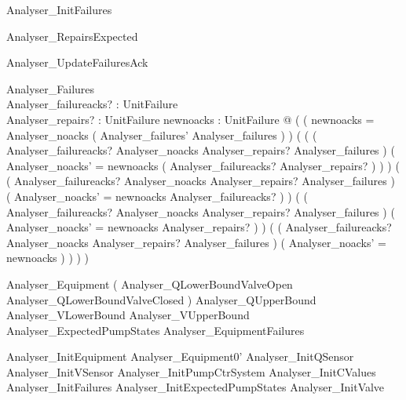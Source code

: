 \documentclass{article}
\begin{document}
\begin{zed}
	Analyser\_InitFailures 
\end{zed}

\begin{zed}
	Analyser\_RepairsExpected 
\end{zed}

\begin{schema}{Analyser\_UpdateFailuresAck}

 \Delta Analyser\_Failures \\
 Analyser\_failureacks? : \power UnitFailure \\
 Analyser\_repairs? : \power UnitFailure 
\where
 \exists newnoacks : \power UnitFailure @ ( ( newnoacks = Analyser\_noacks \cup ( Analyser\_failures' \setminus Analyser\_failures ) ) \land ( ( ( Analyser\_failureacks? \subseteq Analyser\_noacks \land Analyser\_repairs? \subseteq Analyser\_failures ) \implies ( Analyser\_noacks' = newnoacks \setminus ( Analyser\_failureacks? \cup Analyser\_repairs? ) ) ) \land ( ( Analyser\_failureacks? \subseteq Analyser\_noacks \land \lnot Analyser\_repairs? \subseteq Analyser\_failures ) \implies ( Analyser\_noacks' = newnoacks \setminus Analyser\_failureacks? ) ) \land ( ( \lnot Analyser\_failureacks? \subseteq Analyser\_noacks \land Analyser\_repairs? \subseteq Analyser\_failures ) \implies ( Analyser\_noacks' = newnoacks \setminus Analyser\_repairs? ) ) \land ( ( \lnot Analyser\_failureacks? \subseteq Analyser\_noacks \land \lnot Analyser\_repairs? \subseteq Analyser\_failures ) \implies ( Analyser\_noacks' = newnoacks ) ) ) )
\end{schema}

\begin{zed}
	Analyser\_Equipment  ( Analyser\_QLowerBoundValveOpen \lor Analyser\_QLowerBoundValveClosed ) \land Analyser\_QUpperBound \land Analyser\_VLowerBound \land Analyser\_VUpperBound \land Analyser\_ExpectedPumpStates \land Analyser\_EquipmentFailures
\end{zed}

\begin{zed}
	Analyser\_InitEquipment  Analyser\_Equipment0' \land Analyser\_InitQSensor \land Analyser\_InitVSensor \land Analyser\_InitPumpCtrSystem \land Analyser\_InitCValues \land Analyser\_InitFailures \land Analyser\_InitExpectedPumpStates \land Analyser\_InitValve
\end{zed}
\end{document}
